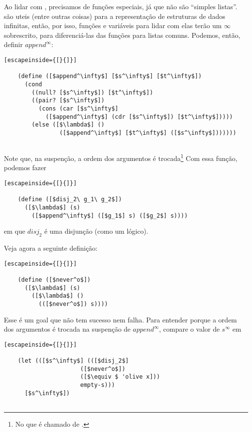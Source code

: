 \documentclass{article}
\begin{document}
  Ao lidar com , precisamos de funções especiais,
  já que não são ``simples listas''.  são uteis
  (entre outras coisas) para a representação de estruturas de dados
  infinitas, então, por isso, funções e variáveis para lidar com elas
  terão um $\infty$ sobrescrito, para diferenciá-las das funções para
  listas comuns. Podemos, então, definir $append^\infty$:

  \begin{lstlisting}[escapeinside={[}{]}]

    (define ([$append^\infty$] [$s^\infty$] [$t^\infty$])
      (cond
        ((null? [$s^\infty$]) [$t^\infty$])
        ((pair? [$s^\infty$])
          (cons (car [$s^\infty$]
            ([$append^\infty$] (cdr [$s^\infty$]) [$t^\infty$]))))
        (else ([$\lambda$] ()
                ([$append^\infty$] [$t^\infty$] ([$s^\infty$]))))))
        
  \end{lstlisting}

  \noindent Note que, na suspenção, a ordem dos argumentos é
  trocada\footnote{No que é chamado de  \cite{tramp}.}
  Com essa função, podemos fazer

  \begin{lstlisting}[escapeinside={[}{]}]

    (define ([$disj_2\ g_1\ g_2$])
      ([$\lambda$] (s)
        ([$append^\infty$] ([$g_1$] s) ([$g_2$] s))))

  \end{lstlisting}
      
  \noindent em que $disj_2$ é uma disjunção (como um 
  lógico). 

  Veja agora a seguinte definição:

  \begin{lstlisting}[escapeinside={[}{]}]

    (define ([$never^o$])
      ([$\lambda$] (s)
        ([$\lambda$] ()
          (([$never^o$]) s))))

  \end{lstlisting}

  \noindent Esse é um goal que não tem sucesso nem falha. Para entender
  porque a ordem dos argumentos é trocada na suspenção de $append^\infty$,
  compare o valor de $s^\infty$ em
  \vspace{.7cm}

  \begin{lstlisting}[escapeinside={[}{]}]

    (let (([$s^\infty$] (([$disj_2$]
                      ([$never^o$])
                      ([$\equiv $ 'olive x]))
                      empty-s)))
      [$s^\infty$])
                      
  \end{lstlisting}
\end{document}
